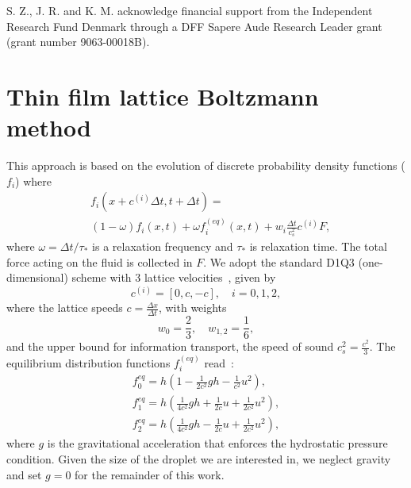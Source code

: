 \documentclass[twocolumn,amsmath,amssymb,showpacs,nofootinbib,prfluids,superscriptaddress]{revtex4-2} %
\begin{document}
\begin{acknowledgements}
S. Z., J. R. and K. M. acknowledge financial support from the Independent Research Fund Denmark through a DFF Sapere Aude Research Leader grant (grant number 9063-00018B).

\end{acknowledgements}


%

\appendix

\section{Thin film lattice Boltzmann method}\label{app:two}
This approach is based on the evolution of discrete probability density functions ($f_i$) where
\begin{equation}\label{eq:LBE}
    \begin{split}
        &f_i(x+c^{(i)}\Delta t,t+\Delta t) = \\
        &\left(1 - \omega\right) f_i(x,t) + \omega f_i^{(eq)}(x,t) + w_i \frac{\Delta t}{c_s^2} c^{(i)} F,
    \end{split}
\end{equation}
where $\omega = \Delta t/\tau_{\ast}$ is a relaxation frequency and $\tau_{\ast}$ is relaxation time. 
The total force acting on the fluid is collected in $F$.
We adopt the standard D1Q3 (one-dimensional) scheme with $3$ lattice velocities~\cite{krueger2017}, given by
\begin{equation}\label{eq:speeds}
c^{(i)}  = [0, c, -c], \quad i = 0, 1, 2,
\end{equation}
where the lattice speeds $c=\frac{\Delta x}{\Delta t}$, with weights
\begin{equation}
w_0 = \frac{2}{3},\quad w_{1,2} = \frac{1}{6},
\end{equation}
and the upper bound for information transport, the speed of sound $c_s^2=\frac{c^2}{3}$.
The equilibrium distribution functions $f_i^{(eq)}$ read~\cite{VANTHANG20107373}:
\begin{gather}
    f_{0}^{eq} = h\left(1-\frac{1}{2c^2}gh - \frac{1}{c^2}u^2\right),\nonumber\\
    f_{1}^{eq} = h\left(\frac{1}{4c^2}gh + \frac{1}{2c}u + \frac{1}{2c^2}u^2\right)\label{eq:equilibria},\\
    f_{2}^{eq} = h\left(\frac{1}{4c^2}gh - \frac{1}{2c}u + \frac{1}{2c^2}u^2\right),\nonumber
\end{gather}
where $g$ is the gravitational acceleration that enforces the hydrostatic pressure condition. 
Given the size of the droplet we are interested in, we neglect gravity and set $g=0$ for the remainder of this work.
\end{document}
